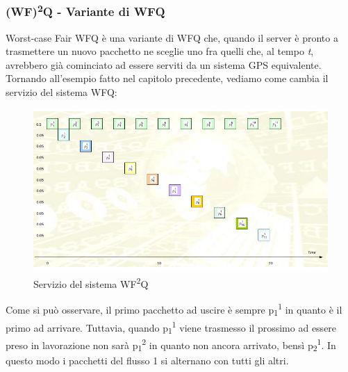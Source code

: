 \documentclass{article}
\begin{document}
\newpage
\subsubsection{(WF)\textsuperscript{2}Q - Variante di WFQ}
Worst-case Fair WFQ è una variante di WFQ che, quando il server è pronto a trasmettere un nuovo pacchetto ne sceglie uno fra quelli che, al tempo \textit{t}, avrebbero già cominciato ad essere serviti da un sistema GPS equivalente. Tornando all'esempio fatto nel capitolo precedente, vediamo come cambia il servizio del sistema WFQ:
\begin{figure}[H]
    \centering
    \includegraphics[scale=2]{figures/fairness3.jpg}
    \caption{Servizio del sistema WF\textsuperscript{2}Q}
\end{figure}
\noindent Come si può osservare, il primo pacchetto ad uscire è sempre p\textsubscript{1}\textsuperscript{1} in quanto è il primo ad arrivare. Tuttavia, quando p\textsubscript{1}\textsuperscript{1} viene trasmesso il prossimo ad essere preso in lavorazione non sarà p\textsubscript{1}\textsuperscript{2} in quanto non ancora arrivato, bensì p\textsubscript{2}\textsuperscript{1}. In questo modo i pacchetti del flusso 1 si alternano con tutti gli altri.

\newpage
\end{document}
